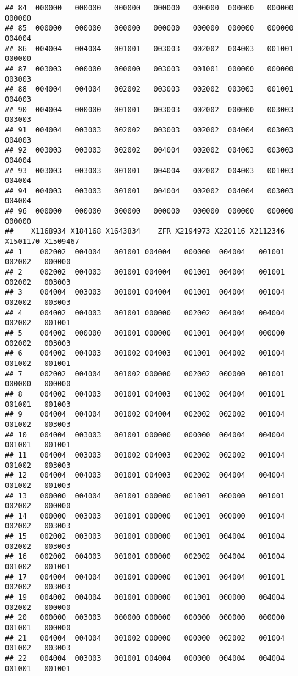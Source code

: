 \documentclass[
]{article}
\begin{document}
\begin{verbatim}
## 84  000000   000000   000000   000000   000000  000000   000000   000000
## 85  000000   000000   000000   000000   000000  000000   000000   004004
## 86  004004   004004   001001   003003   002002  004003   001001   000000
## 87  003003   000000   000000   003003   001001  000000   000000   003003
## 88  004004   004004   002002   003003   002002  003003   001001   004003
## 90  004004   000000   001001   003003   002002  000000   003003   003003
## 91  004004   003003   002002   003003   002002  004004   003003   004003
## 92  003003   003003   002002   004004   002002  004003   003003   004004
## 93  003003   003003   001001   004004   002002  004003   001003   004004
## 94  004003   003003   001001   004004   002002  004004   003003   004004
## 96  000000   000000   000000   000000   000000  000000   000000   000000
##    X1168934 X184168 X1643834    ZFR X2194973 X220116 X2112346 X1501170 X1509467
## 1    002002  004004   001001 004004   000000  004004   001001   002002   000000
## 2    002002  004003   001001 004004   001001  004004   001001   002002   003003
## 3    004004  003003   001001 004004   001001  004004   001004   002002   003003
## 4    004002  004003   001001 000000   002002  004004   004004   002002   001001
## 5    004002  000000   001001 000000   001001  004004   000000   002002   003003
## 6    004002  004003   001002 004003   001001  004002   001004   001002   001001
## 7    002002  004004   001002 000000   002002  000000   001001   000000   000000
## 8    004002  004003   001001 004003   001002  004004   001001   001001   001003
## 9    004004  004004   001002 004004   002002  002002   001004   001002   003003
## 10   004004  003003   001001 000000   000000  004004   004004   001001   001001
## 11   004004  003003   001002 004003   002002  002002   001004   001002   003003
## 12   004004  004003   001001 004003   002002  004004   004004   001002   001003
## 13   000000  004004   001001 000000   001001  000000   001001   002002   000000
## 14   000000  003003   001001 000000   001001  000000   001004   002002   003003
## 15   002002  003003   001001 000000   001001  004004   001004   002002   003003
## 16   002002  004003   001001 000000   002002  004004   001004   001002   001001
## 17   004004  004004   001001 000000   001001  004004   001001   002002   003003
## 19   004002  004004   001001 000000   001001  000000   004004   002002   000000
## 20   000000  003003   000000 000000   000000  000000   000000   001001   000000
## 21   004004  004004   001002 000000   000000  002002   001004   001002   003003
## 22   004004  003003   001001 004004   000000  004004   004004   001001   001001

\end{verbatim}
\end{document}
